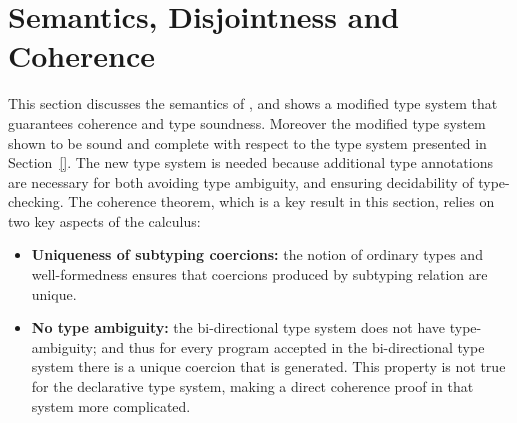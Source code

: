 \section{Semantics, Disjointness and Coherence}
\label{sec:disjoint}
This section discusses the semantics of \name, and shows a modified
type system that guarantees coherence and type soundness. Moreover the
modified type system shown to be sound and complete with respect to
the type system presented in Section~\ref{}. The new type system is
needed because additional type annotations are necessary for both 
avoiding type ambiguity, and ensuring decidability of type-checking. 
The coherence theorem, which is a key result in this section, 
relies on two key aspects of the calculus: 

\begin{itemize}

\item {\bf Uniqueness of subtyping coercions:} 
the notion of ordinary types and 
well-formedness ensures that coercions produced by
subtyping relation are unique.

\item {\bf No type ambiguity:} the bi-directional
type system does not have type-ambiguity; and thus for every program
accepted in the bi-directional type system there is a unique coercion 
that is generated. This property is not true for the declarative type
system, making a direct coherence proof in that system more complicated.  

\end{itemize}

\begin{comment}
The key 
aspect to ensuring coherence is the notion of disjoint intersection.

\bruno{How to pitch this section:}
Three things to ensure coherence:

1) Ordinary + Well-formedness ensure that coercions produced by
subtyping relation are unique; 

2) Bi-directional type-system ensures that unambiguous types: the 
additional type annotations are enough to remove ambiguity, and ensure
that the calculus always elaborates every program to a unique
expression in the target language.
\end{comment}

